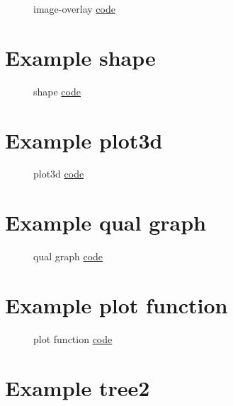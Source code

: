 \documentclass{article}
\begin{document}
\begin{figure}[H]
	\centering
	
	\caption{image-overlay \href{https:/github.com/cauliyang/learn_tikz/blob/main/image-overlay.tex}{code} }
	\label{fig:image-overlay}
\end{figure}

\section{Example shape}

\begin{figure}[H]
	\centering
	
	\caption{shape \href{https:/github.com/cauliyang/learn_tikz/blob/main/shape.tex}{code} }
	\label{fig:shape}
\end{figure}

\section{Example plot3d}

\begin{figure}[H]
	\centering
	
	\caption{plot3d \href{https:/github.com/cauliyang/learn_tikz/blob/main/plot3d.tex}{code} }
	\label{fig:plot3d}
\end{figure}

\section{Example qual graph}

\begin{figure}[H]
	\centering
	
	\caption{qual graph \href{https:/github.com/cauliyang/learn_tikz/blob/main/qual_graph.tex}{code} }
	\label{fig:qual graph}
\end{figure}

\section{Example plot function}

\begin{figure}[H]
	\centering
	
	\caption{plot function \href{https:/github.com/cauliyang/learn_tikz/blob/main/plot_function.tex}{code} }
	\label{fig:plot function}
\end{figure}

\section{Example tree2}
\end{document}
